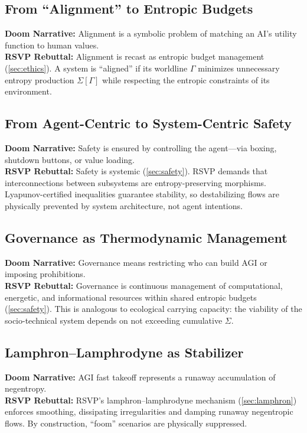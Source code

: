 \documentclass[12pt]{article}
\begin{document}
\subsection{From ``Alignment'' to Entropic Budgets}
\textbf{Doom Narrative:} Alignment is a symbolic problem of matching an AI’s utility function to human values.\\
\textbf{RSVP Rebuttal:} Alignment is recast as entropic budget management (\autoref{sec:ethics}). A system is ``aligned'' if its worldline $\Gamma$ minimizes unnecessary entropy production $\Sigma[\Gamma]$ while respecting the entropic constraints of its environment.

\subsection{From Agent-Centric to System-Centric Safety}
\textbf{Doom Narrative:} Safety is ensured by controlling the agent—via boxing, shutdown buttons, or value loading.\\
\textbf{RSVP Rebuttal:} Safety is systemic (\autoref{sec:safety}). RSVP demands that interconnections between subsystems are entropy-preserving morphisms. Lyapunov-certified inequalities guarantee stability, so destabilizing flows are physically prevented by system architecture, not agent intentions.

\subsection{Governance as Thermodynamic Management}
\textbf{Doom Narrative:} Governance means restricting who can build AGI or imposing prohibitions.\\
\textbf{RSVP Rebuttal:} Governance is continuous management of computational, energetic, and informational resources within shared entropic budgets (\autoref{sec:safety}). This is analogous to ecological carrying capacity: the viability of the socio-technical system depends on not exceeding cumulative $\Sigma$.

\subsection{Lamphron–Lamphrodyne as Stabilizer}
\textbf{Doom Narrative:} AGI fast takeoff represents a runaway accumulation of negentropy.\\
\textbf{RSVP Rebuttal:} RSVP’s lamphron–lamphrodyne mechanism (\autoref{sec:lamphron}) enforces smoothing, dissipating irregularities and damping runaway negentropic flows. By construction, ``foom'' scenarios are physically suppressed.
\end{document}
